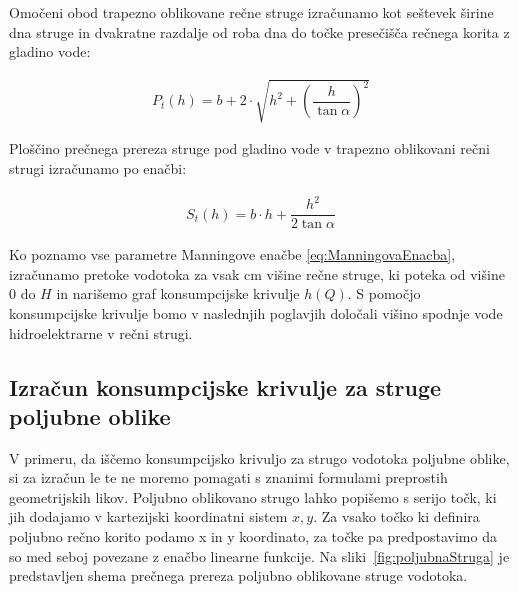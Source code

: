 \begin{enumerate}
	Omočeni obod trapezno oblikovane rečne struge izračunamo kot seštevek širine dna struge in dvakratne razdalje od roba dna do točke presečišča rečnega korita z gladino vode:
	
	\begin{ceqn}
	\begin{align}
	P_{t}(h) = b + 2 \cdot \sqrt{h^2 + \left(\dfrac{h} {\tan\alpha} \right)^{2}}
	\end{align}
	\end{ceqn}
	
	Ploščino prečnega prereza struge pod gladino vode v trapezno oblikovani rečni strugi izračunamo po enačbi:
	\begin{ceqn}
	\begin{align}
	S_{t}(h) = b \cdot h + \dfrac{h^2}{ 2\tan\alpha}
	\end{align}
	\end{ceqn}
	
\end{enumerate}



Ko poznamo vse parametre Manningove enačbe \ref{eq:ManningovaEnacba}, izračunamo pretoke vodotoka za vsak cm višine rečne struge, ki poteka od višine 0 do $H$ in narišemo graf konsumpcijske krivulje $h(Q)$. S pomočjo konsumpcijske krivulje bomo v naslednjih poglavjih določali višino spodnje vode hidroelektrarne v rečni strugi.



\subsection{Izračun konsumpcijske krivulje za struge poljubne oblike} \label{sec:teorija_metodaPoljubnaOblika}


V primeru, da iščemo konsumpcijsko krivuljo za strugo vodotoka poljubne oblike, si za izračun le te ne moremo pomagati s znanimi formulami preprostih geometrijskih likov. Poljubno oblikovano strugo lahko popišemo s serijo točk, ki jih dodajamo v kartezijski koordinatni sistem $x,y$. Za vsako točko ki definira poljubno rečno korito podamo x in y koordinato, za točke pa predpostavimo da so med seboj povezane z enačbo linearne funkcije. Na sliki~\ref{fig:poljubnaStruga} je predstavljen shema prečnega prereza poljubno oblikovane struge vodotoka.

